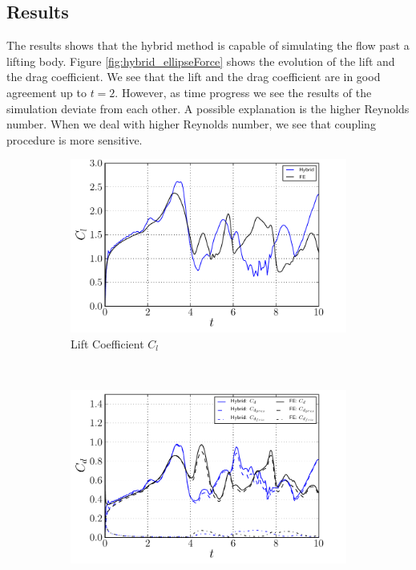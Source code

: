\subsection{Results}

The results shows that the hybrid method is capable of simulating the flow past a lifting body. Figure \ref{fig:hybrid_ellipseForce} shows the evolution of the lift and the drag coefficient. We see that the lift and the drag coefficient are in good agreement up to $t=2$. However, as time progress we see the results of the simulation deviate from each other. A possible explanation is the higher Reynolds number. When we deal with higher Reynolds number, we see that coupling procedure is more sensitive.

	\begin{figure}[!p]
     \centering
     \begin{subfigure}[t]{0.49\textwidth}
             \includegraphics[width=\textwidth]{./figures/validation/ellipse/hybrid_ellipseForce_CL.pdf}
             \caption{Lift Coefficient $C_l$}
             \label{fig:hybrid_ellipseForce_CL}
     \end{subfigure}%
     ~ %
     \begin{subfigure}[t]{0.49\textwidth}
             \includegraphics[width=\textwidth]{./figures/validation/ellipse/hybrid_ellipseForce_CD.pdf}

\end{subfigure}
\end{figure}
